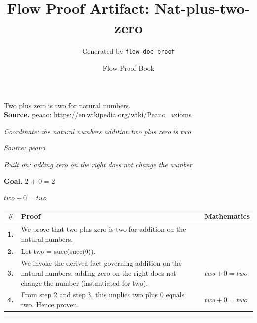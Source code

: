 \documentclass[11pt]{article}
\title{Flow Proof Artifact: Nat-plus-two-zero}
\author{Generated by \texttt{flow doc proof}}
\date{Flow Proof Book}
\theoremstyle{definition}
\begin{document}
\maketitle
Two plus zero is two for natural numbers.\\[0.5em]
\textbf{Source.} peano: https://en.wikipedia.org/wiki/Peano\_axioms\\[0.5em]
\bigskip
{}\par
\smallskip\noindent\textit{Coordinate: the natural numbers \cdot addition \cdot two plus zero is two}\par
\smallskip\noindent\textit{Source: peano}\par
\smallskip\noindent\textit{Built on: adding zero on the right does not change the number}\par
\medskip
\noindent\textbf{Goal.} 2 + 0 = 2\par
\noindent$\displaystyle two + 0 = two$\par
\medskip
\noindent
\begin{tabular}{@{} >{\raggedright\arraybackslash}p{} >{\raggedright\arraybackslash}p{} >{\raggedleft\arraybackslash}p{} @{}}
\textbf{\#} & \textbf{Proof} & \textbf{Mathematics} \\
\midrule
\textbf{1.} & We prove that two plus zero is two for addition on the natural numbers. & \\[0.45em]
\textbf{2.} & Let two = succ(succ(0)). & \\[0.45em]
\textbf{3.} & We invoke the derived fact governing addition on the natural numbers: adding zero on the right does not change the number (instantiated for two). & $\displaystyle two + 0 = two$ \\[0.45em]
\textbf{4.} & From step 2 and step 3, this implies two plus 0 equals two. Hence proven. & $\displaystyle two + 0 = two$ \\[0.45em]
\bottomrule
\end{tabular}
\label{thm:Nat-addition-two_plus_zero_is_two}
\par\medskip\hrule
\end{document}
